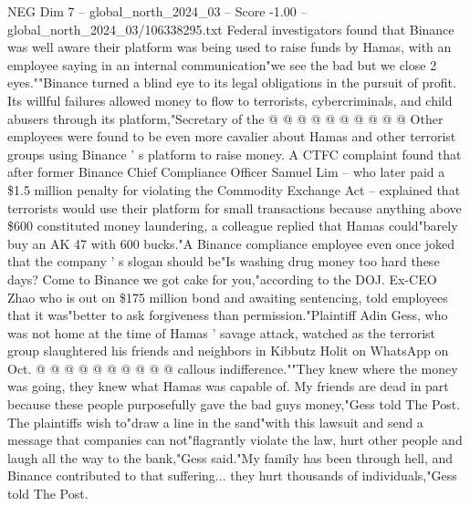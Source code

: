 \begin{textsample}{NEG Dim 7 – global\_north\_2024\_03 – Score -1.00 – global\_north\_2024\_03/106338295.txt}
Federal investigators found that Binance was well aware their platform was being used to raise funds by Hamas, with an employee saying in an internal communication"we see the bad but we close 2 eyes.""Binance turned a blind eye to its legal obligations in the pursuit of profit.
Its willful failures allowed money to flow to terrorists, cybercriminals, and child abusers through its platform,"Secretary of the @ @ @ @ @ @ @ @ @ @ Other employees were found to be even more cavalier about Hamas and other terrorist groups using Binance ' s platform to raise money.
A CTFC complaint found that after former Binance Chief Compliance Officer Samuel Lim -- who later paid a \$1.5 million penalty for violating the Commodity Exchange Act -- explained that terrorists would use their platform for small transactions because anything above \$600 constituted money laundering, a colleague replied that Hamas could"barely buy an AK 47 with 600 bucks."A Binance compliance employee even once joked that the company ' s slogan should be"Is washing drug money too hard these days?
Come to Binance we got cake for you,"according to the DOJ.
Ex-CEO Zhao who is out on \$175 million bond and awaiting sentencing, told employees that it was"better to ask forgiveness than permission."Plaintiff Adin Gess, who was not home at the time of Hamas ' savage attack, watched as the terrorist group slaughtered his friends and neighbors in Kibbutz Holit on WhatsApp on Oct. @ @ @ @ @ @ @ @ @ @ callous indifference.""They knew where the money was going, they knew what Hamas was capable of.
My friends are dead in part because these people purposefully gave the bad guys money,"Gess told The Post.
The plaintiffs wish to"draw a line in the sand"with this lawsuit and send a message that companies can not"flagrantly violate the law, hurt other people and laugh all the way to the bank,"Gess said."My family has been through hell, and Binance contributed to that suffering... they hurt thousands of individuals,"Gess told The Post.

\end{textsample}
